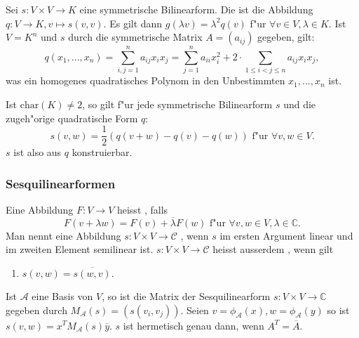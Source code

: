 \documentclass[8pt, a4paper, twocolumn, landscape]{article}
\begin{document}
\begin{definition}
Sei $s: V \times V \rightarrow K$ eine symmetrische Bilinearform. Die  ist die Abbildung
$
q : V \rightarrow K, v \mapsto s(v, v).
$
Es gilt dann $g(\lambda v) = \lambda^2 q(v)$ f"ur  $\forall v \in V, \lambda \in K$.
Ist $V = K^n$ und $s$ durch die symmetrische Matrix $A = (a_{ij})$ gegeben, gilt:
\begin{equation*}
q(x_1, ..., x_n) = \sum\limits_{i, j = 1}^n a_{ij} x_i x_j = \sum\limits_{j = 1}^n a_{ii} x_i^2 + 2 \cdot \sum\limits_{1 \leq i < j \leq n} a_{ij}x_ix_j,
\end{equation*}
was ein homogenes quadratisches Polynom in den Unbestimmten $x_1, ..., x_n$ ist.
\end{definition}

\begin{theorem} 
Ist $\textrm{char}(K) \neq 2$, so gilt f"ur jede symmetrische Bilinearform $s$ und die zugeh"orige quadratische Form $q$:
\begin{equation*}
s(v, w) = \frac{1}{2}(q(v+w)-q(v)-q(w)) \text{ f"ur } \forall v, w \in V.
\end{equation*}
$s$ ist also aus $q$ konstruierbar.
\end{theorem}


\subsubsection{Sesquilinearformen}
\begin{definition}
Eine Abbildung $F:V \rightarrow V$ heisst , falls 
\begin{equation*}
F(v + \lambda w) = F(v ) + \overline{\lambda} F(w) \text{ f"ur } \forall v, w \in V, \lambda \in \mathbb{C}.
\end{equation*}
Man nennt eine Abbildung $s: V \times V \rightarrow \mathcal{C}$ , wenn $s$ im ersten Argument linear und im zweiten Element semilinear ist.
$s : V \times V \rightarrow \mathcal{C}$ heisst ausserdem , wenn gilt
\begin{enumerate}
\item[\bt{H}] $s(v, w) = \overline{s(w, v)}.$
\end{enumerate}
\end{definition}


\begin{remark}
Ist $\mathcal{A}$ eine Basis von $V$, so ist die Matrix der Sesquilinearform $s : V \times V \rightarrow \mathbb{C}$ gegeben durch $M_\mathcal{A}(s) = (s(v_i, v_j)).$
Seien $v = \phi_\mathcal{A}(x), w = \phi_\mathcal{A} (y)$ so ist 
$
s(v, w) = x^T M_\mathcal{A}(s) \overline{y}.
$
$s$ ist hermetisch genau dann, wenn 
$A^T = \overline{A}$.
\end{remark}
\end{document}
